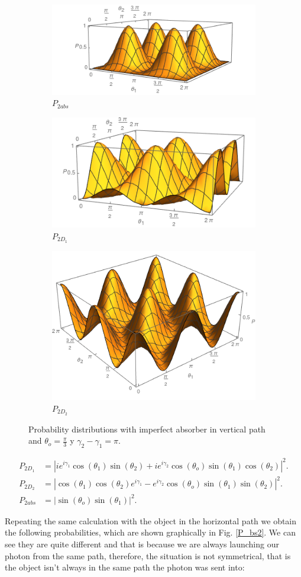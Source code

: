\documentclass{book}
\begin{document}
\begin{figure}[t!]
\centering
\begin{subfigure}[b]{0.45\linewidth}
\includegraphics[width=\linewidth,height=2.8 cm]{images/P1abs.png}
\caption{$P_{2abs}$}
\label{fig:BS2}
\end{subfigure}
\begin{subfigure}[b]{0.45\linewidth}
\includegraphics[width=\linewidth,height=2.8 cm]{images/P1d1.png}
\caption{$P_{2D_{1}}$}
\label{fig:westminster_aerea}
\end{subfigure}
\begin{subfigure}[b]{0.45\linewidth}
\includegraphics[width=\linewidth,height=2.8 cm]{images/P1d2.png}
\caption{$P_{2D_{2}}$}
\label{fig:BS2}
\end{subfigure}
\caption{Probability distributions with imperfect absorber in vertical path and $\theta_{o}=\frac{\pi}{3}$ y $\gamma_{2}-\gamma_{1}=\pi$.}
\label{P_bs}
\end{figure}


\begin{align}
 P_{2D_{1}}&=|ie^{i\gamma_{1}}\cos(\theta_{1})\sin(\theta_{2})+i e^{i\gamma_{2}}\cos(\theta_{o}) \sin(\theta_{1})\cos(\theta_{2})|^2.\\
 P_{2D_{2}}&=|\cos(\theta_{1})\cos(\theta_{2})e^{i\gamma_{1}}- e^{i\gamma_{2}}\cos(\theta_{o}) \sin(\theta_{1})\sin(\theta_{2})|^2.\\
 P_{2abs}&=|\sin(\theta_{o}) \sin(\theta_{1})|^2.
\end{align}


Repeating the same calculation with the object in the horizontal path we obtain the following probabilities, which are shown graphically in Fig. \ref{P_bs2}. We can see they are quite different and that is because we are always launching our photon from the same path, therefore, the situation is not symmetrical, that is the object isn't always in the same path the photon was sent into:
\end{document}
